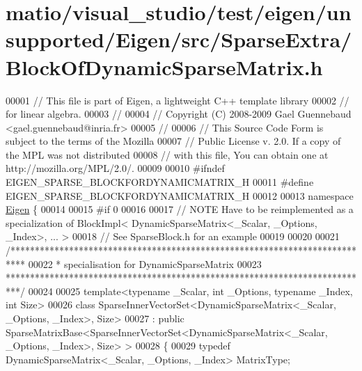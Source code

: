 \hypertarget{matio_2visual__studio_2test_2eigen_2unsupported_2_eigen_2src_2_sparse_extra_2_block_of_dynamic_sparse_matrix_8h_source}{}\section{matio/visual\+\_\+studio/test/eigen/unsupported/\+Eigen/src/\+Sparse\+Extra/\+Block\+Of\+Dynamic\+Sparse\+Matrix.h}
\label{matio_2visual__studio_2test_2eigen_2unsupported_2_eigen_2src_2_sparse_extra_2_block_of_dynamic_sparse_matrix_8h_source}

\begin{DoxyCode}
00001 \textcolor{comment}{// This file is part of Eigen, a lightweight C++ template library}
00002 \textcolor{comment}{// for linear algebra.}
00003 \textcolor{comment}{//}
00004 \textcolor{comment}{// Copyright (C) 2008-2009 Gael Guennebaud <gael.guennebaud@inria.fr>}
00005 \textcolor{comment}{//}
00006 \textcolor{comment}{// This Source Code Form is subject to the terms of the Mozilla}
00007 \textcolor{comment}{// Public License v. 2.0. If a copy of the MPL was not distributed}
00008 \textcolor{comment}{// with this file, You can obtain one at http://mozilla.org/MPL/2.0/.}
00009 
00010 \textcolor{preprocessor}{#ifndef EIGEN\_SPARSE\_BLOCKFORDYNAMICMATRIX\_H}
00011 \textcolor{preprocessor}{#define EIGEN\_SPARSE\_BLOCKFORDYNAMICMATRIX\_H}
00012 
00013 \textcolor{keyword}{namespace }\hyperlink{namespace_eigen}{Eigen} \{ 
00014 
00015 \textcolor{preprocessor}{#if 0}
00016 
00017 \textcolor{comment}{// NOTE Have to be reimplemented as a specialization of BlockImpl< DynamicSparseMatrix<\_Scalar, \_Options,
       \_Index>, ... >}
00018 \textcolor{comment}{// See SparseBlock.h for an example}
00019 
00020 
00021 \textcolor{comment}{/***************************************************************************}
00022 \textcolor{comment}{* specialisation for DynamicSparseMatrix}
00023 \textcolor{comment}{***************************************************************************/}
00024 
00025 \textcolor{keyword}{template}<\textcolor{keyword}{typename} \_Scalar, \textcolor{keywordtype}{int} \_Options, \textcolor{keyword}{typename} \_Index, \textcolor{keywordtype}{int} Size>
00026 \textcolor{keyword}{class }SparseInnerVectorSet<DynamicSparseMatrix<\_Scalar, \_Options, \_Index>, Size>
00027   : \textcolor{keyword}{public} SparseMatrixBase<SparseInnerVectorSet<DynamicSparseMatrix<\_Scalar, \_Options, \_Index>, Size> >
00028 \{
00029     \textcolor{keyword}{typedef} DynamicSparseMatrix<\_Scalar, \_Options, \_Index> MatrixType;

\end{DoxyCode}
